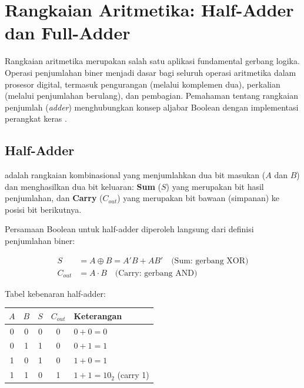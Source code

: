 \section{Rangkaian Aritmetika: Half-Adder dan Full-Adder}

Rangkaian aritmetika merupakan salah satu aplikasi fundamental gerbang logika. Operasi penjumlahan biner menjadi dasar bagi seluruh operasi aritmetika dalam prosesor digital, termasuk pengurangan (melalui komplemen dua), perkalian (melalui penjumlahan berulang), dan pembagian. Pemahaman tentang rangkaian penjumlah (\textit{adder}) menghubungkan konsep aljabar Boolean dengan implementasi perangkat keras \cite{rosen2019}.

\subsection{Half-Adder}

\begin{definisi}
 adalah rangkaian kombinasional yang menjumlahkan dua bit masukan ($A$ dan $B$) dan menghasilkan dua bit keluaran: \textbf{Sum} ($S$) yang merupakan bit hasil penjumlahan, dan \textbf{Carry} ($C_{out}$) yang merupakan bit bawaan (simpanan) ke posisi bit berikutnya.
\end{definisi}

Persamaan Boolean untuk half-adder diperoleh langsung dari definisi penjumlahan biner:

\begin{align*}
S &= A \oplus B = A'B + AB' \quad \text{(Sum: gerbang XOR)} \\
C_{out} &= A \cdot B \quad \text{(Carry: gerbang AND)}
\end{align*}

Tabel kebenaran half-adder:

\begin{center}
\renewcommand{\arraystretch}{1.2}
\begin{tabular}{|c|c||c|c|l|}
\hline
$A$ & $B$ & $S$ & $C_{out}$ & \textbf{Keterangan} \\ \hline
0 & 0 & 0 & 0 & $0 + 0 = 0$ \\ \hline
0 & 1 & 1 & 0 & $0 + 1 = 1$ \\ \hline
1 & 0 & 1 & 0 & $1 + 0 = 1$ \\ \hline
1 & 1 & 0 & 1 & $1 + 1 = 10_2$ (carry 1) \\ \hline
\end{tabular}
\end{center}

